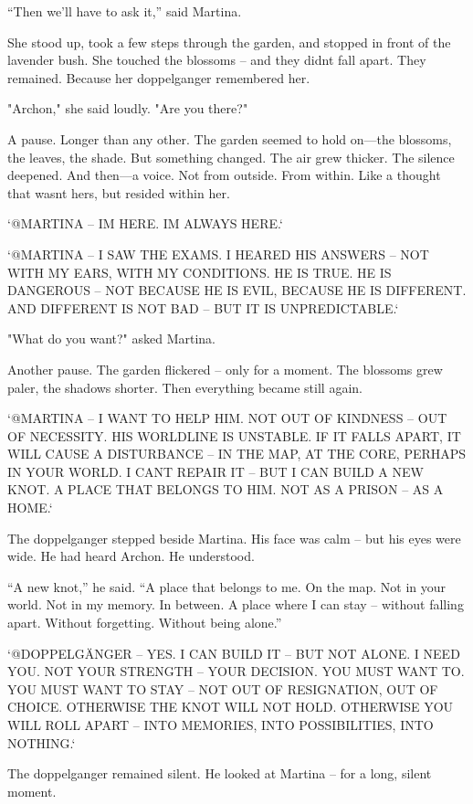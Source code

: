 \documentclass[
]{article}
\begin{document}
``Then we'll have to ask it,'' said Martina.

She stood up, took a few steps through the garden, and stopped in front of the lavender bush. She touched the blossoms -- and they didn\textquotesingle t fall apart. They remained. Because her doppelganger remembered her.

"Archon," she said loudly. "Are you there?"

A pause. Longer than any other. The garden seemed to hold on---the blossoms, the leaves, the shade. But something changed. The air grew thicker. The silence deepened. And then---a voice. Not from outside. From within. Like a thought that wasn\textquotesingle t hers, but resided within her.

`@MARTINA -- I\textquotesingle M HERE. I\textquotesingle M ALWAYS HERE.`

`@MARTINA -- I SAW THE EXAMS. I HEARED HIS ANSWERS -- NOT WITH MY EARS, WITH MY CONDITIONS. HE IS TRUE. HE IS DANGEROUS -- NOT BECAUSE HE IS EVIL, BECAUSE HE IS DIFFERENT. AND DIFFERENT IS NOT BAD -- BUT IT IS UNPREDICTABLE.`

"What do you want?" asked Martina.

Another pause. The garden flickered -- only for a moment. The blossoms grew paler, the shadows shorter. Then everything became still again.

`@MARTINA -- I WANT TO HELP HIM. NOT OUT OF KINDNESS -- OUT OF NECESSITY. HIS WORLDLINE IS UNSTABLE. IF IT FALLS APART, IT WILL CAUSE A DISTURBANCE -- IN THE MAP, AT THE CORE, PERHAPS IN YOUR WORLD. I CAN\textquotesingle T REPAIR IT -- BUT I CAN BUILD A NEW KNOT. A PLACE THAT BELONGS TO HIM. NOT AS A PRISON -- AS A HOME.`

The doppelganger stepped beside Martina. His face was calm -- but his eyes were wide. He had heard Archon. He understood.

``A new knot,'' he said. ``A place that belongs to me. On the map. Not in your world. Not in my memory. In between. A place where I can stay -- without falling apart. Without forgetting. Without being alone.''

`@DOPPELGÄNGER -- YES. I CAN BUILD IT -- BUT NOT ALONE. I NEED YOU. NOT YOUR STRENGTH -- YOUR DECISION. YOU MUST WANT TO. YOU MUST WANT TO STAY -- NOT OUT OF RESIGNATION, OUT OF CHOICE. OTHERWISE THE KNOT WILL NOT HOLD. OTHERWISE YOU WILL ROLL APART -- INTO MEMORIES, INTO POSSIBILITIES, INTO NOTHING.`

The doppelganger remained silent. He looked at Martina -- for a long, silent moment.
\end{document}
